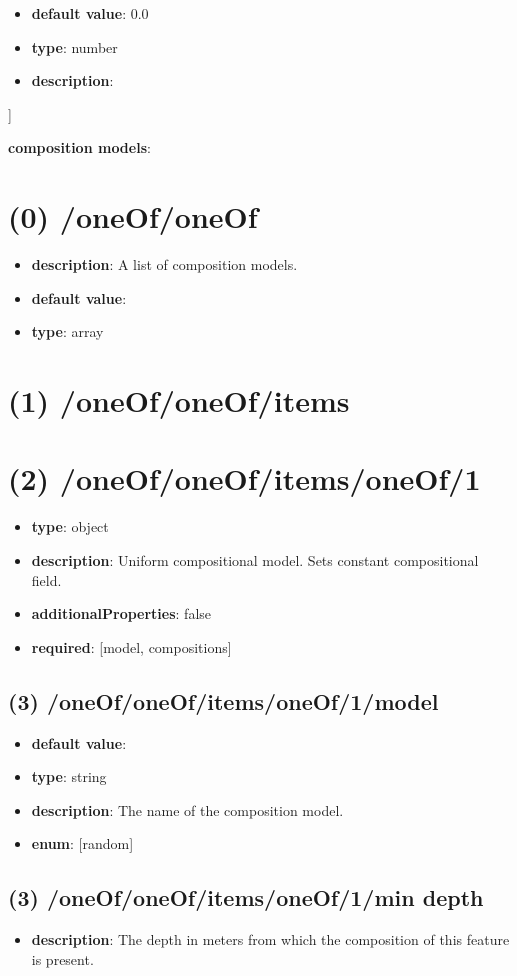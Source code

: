 \begin{itemize}[leftmargin=1em]\item {\bf default value}: 0.0
\item {\bf type}: number
\item {\bf description}: 
\end{itemize}]\item {\bf composition models}: \section{(0) /oneOf/oneOf}
\begin{itemize}[leftmargin=0em]\item {\bf description}: A list of composition models.
\item {\bf default value}: 
\item {\bf type}: array
\end{itemize}\section{(1) /oneOf/oneOf/items}

\section{(2) /oneOf/oneOf/items/oneOf/1}
\begin{itemize}[leftmargin=2em]\item {\bf type}: object
\item {\bf description}: Uniform compositional model. Sets constant compositional field.
\item {\bf additionalProperties}: false
\item {\bf required}: [model, compositions]\end{itemize}
\subsection{(3) /oneOf/oneOf/items/oneOf/1/model}
\begin{itemize}[leftmargin=3em]\item {\bf default value}: 
\item {\bf type}: string
\item {\bf description}: The name of the composition model.
\item {\bf enum}: [random]\end{itemize}\subsection{(3) /oneOf/oneOf/items/oneOf/1/min depth}
\begin{itemize}[leftmargin=3em]\item {\bf description}: The depth in meters from which the composition of this feature is present.
\end{itemize}
